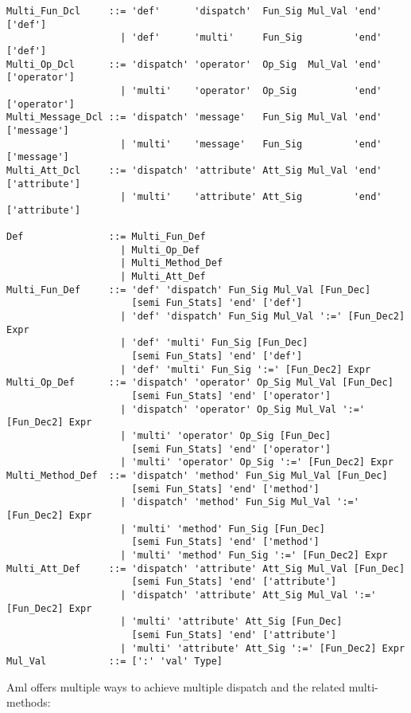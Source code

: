\grammar\begin{lstlisting}
Multi_Fun_Dcl     ::= 'def'      'dispatch'  Fun_Sig Mul_Val 'end' ['def']
                    | 'def'      'multi'     Fun_Sig         'end' ['def']
Multi_Op_Dcl      ::= 'dispatch' 'operator'  Op_Sig  Mul_Val 'end' ['operator']
                    | 'multi'    'operator'  Op_Sig          'end' ['operator']
Multi_Message_Dcl ::= 'dispatch' 'message'   Fun_Sig Mul_Val 'end' ['message']
                    | 'multi'    'message'   Fun_Sig         'end' ['message']
Multi_Att_Dcl     ::= 'dispatch' 'attribute' Att_Sig Mul_Val 'end' ['attribute']
                    | 'multi'    'attribute' Att_Sig         'end' ['attribute']

Def               ::= Multi_Fun_Def
                    | Multi_Op_Def
                    | Multi_Method_Def
                    | Multi_Att_Def
Multi_Fun_Def     ::= 'def' 'dispatch' Fun_Sig Mul_Val [Fun_Dec] 
                      [semi Fun_Stats] 'end' ['def']
                    | 'def' 'dispatch' Fun_Sig Mul_Val ':=' [Fun_Dec2] Expr
                    | 'def' 'multi' Fun_Sig [Fun_Dec] 
                      [semi Fun_Stats] 'end' ['def']
                    | 'def' 'multi' Fun_Sig ':=' [Fun_Dec2] Expr
Multi_Op_Def      ::= 'dispatch' 'operator' Op_Sig Mul_Val [Fun_Dec] 
                      [semi Fun_Stats] 'end' ['operator']
                    | 'dispatch' 'operator' Op_Sig Mul_Val ':=' [Fun_Dec2] Expr
                    | 'multi' 'operator' Op_Sig [Fun_Dec] 
                      [semi Fun_Stats] 'end' ['operator']
                    | 'multi' 'operator' Op_Sig ':=' [Fun_Dec2] Expr
Multi_Method_Def  ::= 'dispatch' 'method' Fun_Sig Mul_Val [Fun_Dec] 
                      [semi Fun_Stats] 'end' ['method']
                    | 'dispatch' 'method' Fun_Sig Mul_Val ':=' [Fun_Dec2] Expr
                    | 'multi' 'method' Fun_Sig [Fun_Dec] 
                      [semi Fun_Stats] 'end' ['method']
                    | 'multi' 'method' Fun_Sig ':=' [Fun_Dec2] Expr
Multi_Att_Def     ::= 'dispatch' 'attribute' Att_Sig Mul_Val [Fun_Dec] 
                      [semi Fun_Stats] 'end' ['attribute']
                    | 'dispatch' 'attribute' Att_Sig Mul_Val ':=' [Fun_Dec2] Expr
                    | 'multi' 'attribute' Att_Sig [Fun_Dec] 
                      [semi Fun_Stats] 'end' ['attribute']
                    | 'multi' 'attribute' Att_Sig ':=' [Fun_Dec2] Expr 
Mul_Val           ::= [':' 'val' Type]
\end{lstlisting}

Aml offers multiple ways to achieve multiple dispatch and the related multi-methods: 

